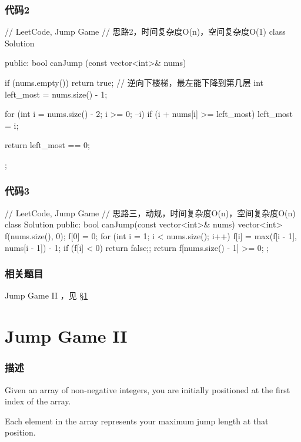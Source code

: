 \subsubsection{代码2}
\begin{Code}
// LeetCode, Jump Game
// 思路2，时间复杂度O(n)，空间复杂度O(1)
class Solution {
public:
    bool canJump (const vector<int>& nums) {
        if (nums.empty()) return true;
        // 逆向下楼梯，最左能下降到第几层
        int left_most = nums.size() - 1;

        for (int i = nums.size() - 2; i >= 0; --i)
            if (i + nums[i] >= left_most)
                left_most = i;

        return left_most == 0;
    }
};
\end{Code}


\subsubsection{代码3}
\begin{Code}
// LeetCode, Jump Game
// 思路三，动规，时间复杂度O(n)，空间复杂度O(n)
class Solution {
public:
    bool canJump(const vector<int>& nums) {
        vector<int> f(nums.size(), 0);
        f[0] = 0;
        for (int i = 1; i < nums.size(); i++) {
            f[i] = max(f[i - 1], nums[i - 1]) - 1;
            if (f[i] < 0) return false;;
        }
        return f[nums.size() - 1] >= 0;
    }
};
\end{Code}


\subsubsection{相关题目}
\begindot
\item Jump Game II ，见 \S \ref{sec:jump-game-ii}
\myenddot


\section{Jump Game II} %
\label{sec:jump-game-ii}


\subsubsection{描述}
Given an array of non-negative integers, you are initially positioned at the first index of the array.

Each element in the array represents your maximum jump length at that position.

